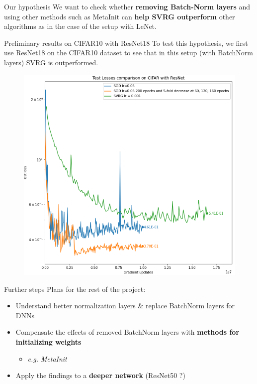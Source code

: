 \documentclass[10pt]{beamer}
\begin{document}
\begin{frame}{Our hypothesis}
    We want to check whether \textbf{removing Batch-Norm layers} and using other methods such as MetaInit can \textbf{help SVRG outperform} other algorithms as in the case of the setup with LeNet.
\end{frame}


\begin{frame}{Preliminary results on CIFAR10 with ResNet18}
    To test this hypothesis, we first use ResNet18 on the CIFAR10 dataset to see that in this setup (with BatchNorm layers) SVRG is outperformed.
    \begin{figure}
        \centering
    \includegraphics[scale=0.32]{midterm presentation/images/resnet18cifar.png}
        \label{fig:testLossesCifar}
    \end{figure}   
\end{frame}

\begin{frame}{Further steps}
    Plans for the rest of the project:
    \begin{itemize}
        \item Understand better normalization layers \& replace BatchNorm layers for DNNs
        \item Compensate the effects of removed BatchNorm layers with \textbf{methods for initializing weights} 
        \begin{itemize}
            \item[] \textit{e.g.} \textit{MetaInit}~\citep{dauphin2019metainit}
        \end{itemize}
        \item Apply the findings to a \textbf{deeper network} (ResNet50 ?)
    \end{itemize}
\end{frame}
\end{document}
